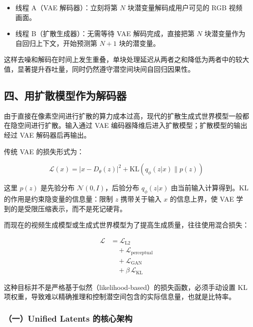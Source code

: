 \begin{itemize}
\tightlist
\item
  线程 A（VAE 解码器）：立刻将第 \(N\) 块潜变量解码成用户可见的 RGB 视频画面。
\item
  线程 B（扩散生成器）：无需等待 VAE 解码完成，直接把第 \(N\) 块潜变量作为自回归上下文，开始预测第 \(N+1\) 块的潜变量。
\end{itemize}

这样去噪和解码在时间上发生重叠，单块处理延迟从两者之和降低为两者中的较大值，显著提升吞吐量，同时仍然遵守潜空间块间自回归因果性。

\hypertarget{ux56dbux7528ux6269ux6563ux6a21ux578bux4f5cux4e3aux89e3ux7801ux5668}{%
\subsection{四、用扩散模型作为解码器}\label{ux56dbux7528ux6269ux6563ux6a21ux578bux4f5cux4e3aux89e3ux7801ux5668}}

由于直接在像素空间进行扩散的算力成本过高，现代的扩散生成式世界模型一般都在隐空间进行扩散。输入通过 VAE 编码器降维后进入扩散模型；扩散模型的输出经过 VAE 解码器后再输出。

传统 VAE 的损失形式为：

\[
\mathcal{L}(x)=|x-D_\theta(z)|^2+\mathrm{KL}(q_\phi(z|x)\|p(z))
\]

这里 \(p(z)\) 是先验分布 \(\mathcal{N}(0,I)\)，后验分布 \(q_\phi(z|x)\) 由当前输入计算得到。KL 的作用是约束隐变量的信息量：限制 \(z\) 携带关于输入 \(x\) 的信息上界，使 VAE 学到的是受限压缩表示，而不是死记硬背。

而现在的视频生成模型或生成式世界模型为了提高生成质量，往往使用混合损失：

\[
\begin{aligned}
\mathcal{L}
&= \mathcal{L}_{\mathrm{L2}}
\\
&\quad + \mathcal{L}_{\mathrm{perceptual}}
\\
&\quad + \mathcal{L}_{\mathrm{GAN}}
\\
&\quad + \beta\,\mathcal{L}_{\mathrm{KL}}
\end{aligned}
\]

这种目标并不是严格基于似然（likelihood-based）的损失函数，必须手动设置 KL 项权重，导致难以精确推理和控制潜空间包含的实际信息量，也就是比特率。

\hypertarget{ux4e00unified-latents-ux7684ux6838ux5fc3ux67b6ux6784}{%
\subsubsection{（一）Unified Latents 的核心架构}\label{ux4e00unified-latents-ux7684ux6838ux5fc3ux67b6ux6784}}

